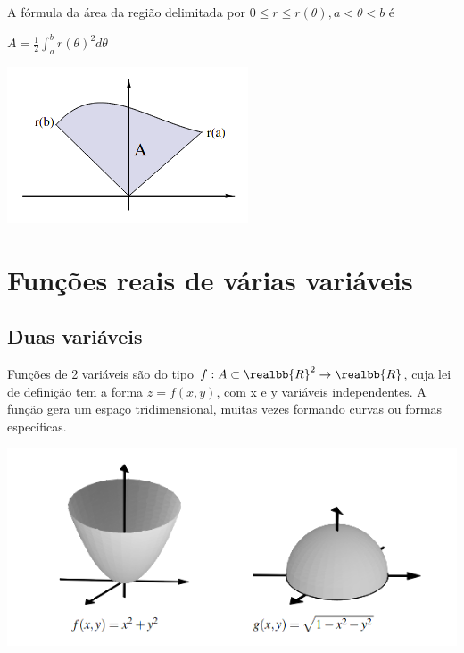 \documentclass[letterpaper, 11pt]{article}
\begin{document}
A fórmula da área da região delimitada por \(0 \le r \le r(\theta), a < \theta < b\) é

\begin{center} $A =\frac{1}{2} \int_{a}^{b} r(\theta)^2 d\theta$ \end{center}

\begin{center}
\includegraphics[width=.9\linewidth]{./img/areapolar.png}
\end{center}

\section{Funções reais de várias variáveis}
\label{sec:org71880e9}
\subsection{Duas variáveis}
\label{sec:org8a44844}
Funções de 2 variáveis são do tipo \(f: A \subset \realbb{R}^2 \rightarrow \realbb{R}\), cuja lei de definição tem a forma \(z = f(x,y)\), com x e y variáveis independentes. A função gera um espaço tridimensional, muitas vezes formando curvas ou formas específicas.

\begin{center}
\includegraphics[width=.9\linewidth]{./img/2varex.png}
\end{center}
\end{document}
